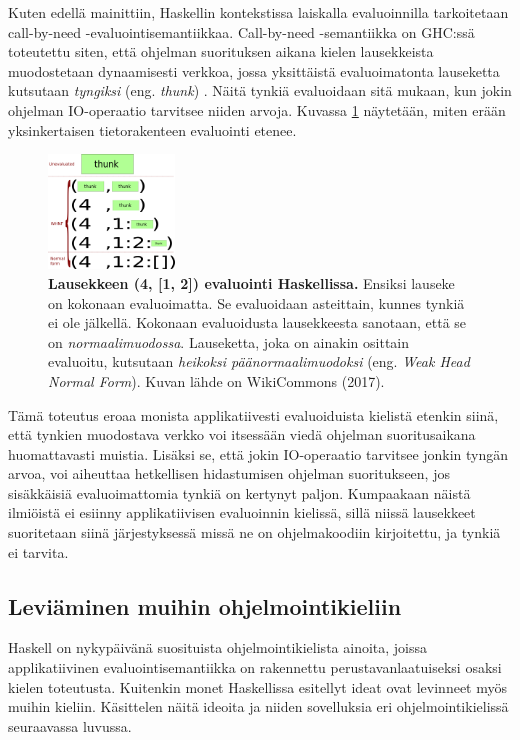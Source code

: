 Kuten edellä mainittiin, Haskellin kontekstissa laiskalla evaluoinnilla tarkoitetaan call-by-need -evaluointisemantiikkaa. Call-by-need -semantiikka on GHC:ssä toteutettu siten, että ohjelman suorituksen aikana kielen lausekkeista muodostetaan dynaamisesti verkkoa, jossa yksittäistä evaluoimatonta lauseketta kutsutaan \textit{tyngiksi} (eng. \textit{thunk}) \citep{hudak2007history}. Näitä tynkiä evaluoidaan sitä mukaan, kun jokin ohjelman IO-operaatio tarvitsee niiden arvoja. Kuvassa \ref{figure:thunk} näytetään, miten erään yksinkertaisen tietorakenteen evaluointi etenee.
\begin{figure}[h]
  \centering
    \includegraphics[width=0.3\textwidth]{figure-thunk-layers}
  \caption{\footnotesize\textbf{Lausekkeen (4, [1, 2]) evaluointi Haskellissa.} Ensiksi lauseke on kokonaan evaluoimatta. Se evaluoidaan asteittain, kunnes tynkiä ei ole jälkellä. Kokonaan evaluoidusta lausekkeesta sanotaan, että se on \textit{normaalimuodossa}. Lauseketta, joka on ainakin osittain evaluoitu, kutsutaan \textit{heikoksi päänormaalimuodoksi} (eng. \textit{Weak Head Normal Form}). Kuvan lähde on WikiCommons (2017).}
  \label{figure:thunk}
\end{figure}

Tämä toteutus eroaa monista applikatiivesti evaluoiduista kielistä etenkin siinä, että tynkien muodostava verkko voi itsessään viedä ohjelman suoritusaikana huomattavasti muistia. Lisäksi se, että jokin IO-operaatio tarvitsee jonkin tyngän arvoa, voi aiheuttaa hetkellisen hidastumisen ohjelman suoritukseen, jos sisäkkäisiä evaluoimattomia tynkiä on kertynyt paljon. Kumpaakaan näistä ilmiöistä ei esiinny applikatiivisen evaluoinnin kielissä, sillä niissä lausekkeet suoritetaan siinä järjestyksessä missä ne on ohjelmakoodiin kirjoitettu, ja tynkiä ei tarvita.

\subsection{Leviäminen muihin ohjelmointikieliin}

Haskell on nykypäivänä suosituista ohjelmointikielista ainoita, joissa applikatiivinen evaluointisemantiikka on rakennettu perustavanlaatuiseksi osaksi kielen toteutusta. Kuitenkin monet Haskellissa esitellyt ideat ovat levinneet myös muihin kieliin. Käsittelen näitä ideoita ja niiden sovelluksia eri ohjelmointikielissä seuraavassa luvussa.
